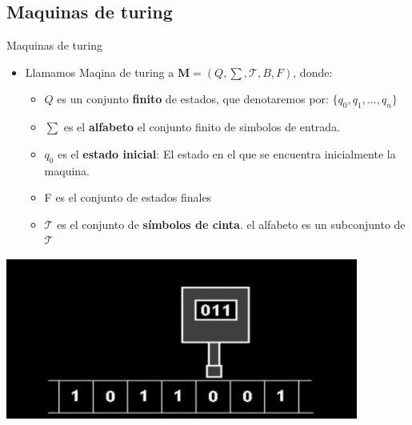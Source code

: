 \documentclass{beamer}
\begin{document}
\subsection{Maquinas de turing}
\begin{frame}{Maquinas de turing}
    \begin{itemize}
        \item Llamamos Maqina de turing a $\mathbf{M}=(Q,\sum,\mathcal{T},B,F)$, donde:
        \begin{itemize}
            \item $Q$ es un conjunto \textbf{finito} de estados, que denotaremos por: $\{ q_0,q_1,...,q_n\}$\pause
            \item $\sum$ es el \textbf{alfabeto} el conjunto finito de simbolos de entrada.\pause
            \item $q_0$ es el \textbf{estado inicial}:
            El estado en el que se encuentra inicialmente la maquina.\pause
            \item F es el conjunto de estados finales\pause
            \item $\mathcal{T}$ es el conjunto de \textbf{símbolos de cinta}. el alfabeto es un subconjunto de $\mathcal{T}$\pause
        \end{itemize}
    \end{itemize}
    \begin{center}
        \includegraphics[scale=0.5]{maquina0.png}
    \end{center}
\end{frame}
\end{document}
